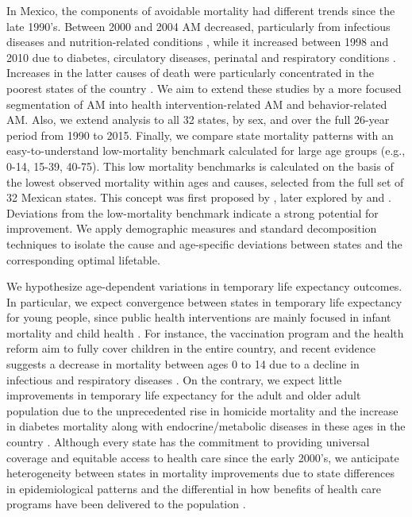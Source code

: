 \documentclass[11.5pt]{article}
\begin{document}
\begin{spacing}{1.5}
In Mexico, the components of avoidable mortality had different trends since the
late 1990's. Between 2000 and 2004 AM decreased, particularly from
infectious diseases and nutrition-related conditions \citep{francomarina2006}, while it increased between 1998 and 2010 due to diabetes, circulatory diseases, perinatal and respiratory conditions
\citep{agudelo2014efecto}. Increases in the latter causes
of death were particularly concentrated in the poorest states of the country
\citep{davila2014mortalidad}. We aim to extend these studies
by a more focused segmentation of AM into health intervention-related AM and
behavior-related AM. Also, we extend analysis to all 32 states, by sex, and over
the full 26-year period from 1990 to 2015. Finally, we compare state mortality patterns
with an easy-to-understand low-mortality benchmark calculated for large age groups (e.g., 0-14, 15-39, 40-75). This low mortality
benchmarks is calculated on the basis of the lowest observed mortality within
ages and causes, selected from the full set of 32 Mexican states. This concept was first
proposed by \citet{whelpton1947}, later explored by  \citet{wunsch1975minimum} and
\citet{vallin2008minimum}. Deviations from the low-mortality benchmark indicate a strong potential for improvement. We apply demographic measures and
standard decomposition techniques to isolate the cause and age-specific deviations between states and the corresponding optimal lifetable. 

We hypothesize age-dependent variations in temporary life expectancy outcomes.
In particular, we expect convergence between states in temporary life expectancy
for young people, since public health interventions are mainly focused in infant
mortality and child health . For instance, the vaccination program and the health
reform aim to fully cover children in the entire country, and recent
evidence suggests a decrease in mortality between ages 0 to 14 due to a decline
in infectious and respiratory diseases \citep{canudas2014}. On the contrary, we
expect little improvements in temporary life expectancy for the adult and older
adult population due to the unprecedented rise in homicide mortality and the
increase in diabetes mortality along with endocrine/metabolic diseases in these ages in the country \citep{canudas2014}. Although every
state has the commitment to providing universal coverage and equitable access to
health care since the early 2000's, we anticipate heterogeneity between states
in mortality improvements due to state differences in epidemiological patterns and the differential in how benefits of health care programs have been delivered to the population
\citep{Frenk2006}.



\end{spacing}
\end{document}
